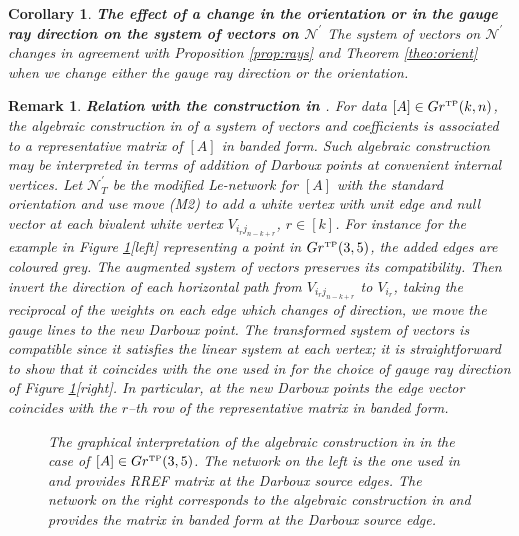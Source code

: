 \documentclass[11pt]{amsart}
\theoremstyle{plain}
\numberwithin{equation}{section}
\newtheorem{corollary}[theorem]{Corollary}
\newtheorem{remark}{Remark}[subsection]
\def \GTP {{Gr^{\mbox{\tiny TP}} (k,n)}}
\begin{document}
\begin{corollary}\textbf{The effect of a change in the orientation or in the gauge ray direction on the system of vectors on ${\mathcal N}^{\prime}$}
The system of vectors on ${\mathcal N}^{\prime}$ changes in agreement with Proposition \ref{prop:rays} and Theorem \ref{theo:orient} when we change either the gauge ray direction or the orientation. 
\end{corollary}

\begin{remark}\label{rem:comp3}\textbf{Relation with the construction in \cite{AG1}}. 
For data $[A]\in \GTP$, the algebraic construction in \cite{AG1} of a system of vectors and coefficients is associated to a representative matrix of $[A]$ in banded form. Such algebraic construction may be interpreted in terms of addition of Darboux points at convenient internal vertices. Let ${\mathcal N}^{\prime}_T$ be the modified Le-network for $[A]$ with the standard orientation and use move (M2) to add a white vertex with unit edge and null vector at each bivalent white vertex $V_{i_rj_{n-k+r}}$, $r\in [k]$. For instance for the example in Figure \ref{fig:Gr35}[left] representing a point in $Gr^{\mbox{\tiny TP}}(3,5)$, the added edges are coloured grey. The augmented system of vectors preserves its compatibility. Then invert the direction of each horizontal path from 
$V_{i_rj_{n-k+r}}$ to $V_{i_r}$, taking the reciprocal of the weights on each edge which changes of direction, we move the gauge lines to the new Darboux point. The transformed system of vectors is compatible since it satisfies the linear system at each vertex; it is straightforward to show that it coincides with the one used in \cite{AG1} for the choice of gauge ray direction of Figure \ref{fig:Gr35}[right]. In particular, at the new Darboux points the edge vector coincides with the $r$--th row of the representative matrix in banded form.
\end{remark}


\begin{figure}%
	\vspace{-.7 truecm}
  \caption{\small{\sl The graphical interpretation of the algebraic construction in \cite{AG1} in the case of $[A]\in Gr^{\mbox{\tiny TP}}(3,5)$. The network on the left is the one used in \cite{AG3} and provides RREF matrix at the Darboux source edges. The network on the right corresponds to the algebraic construction in \cite{AG1} and provides the matrix in banded form at the Darboux source edge. }\label{fig:Gr35}}
\end{figure}
\end{document}
